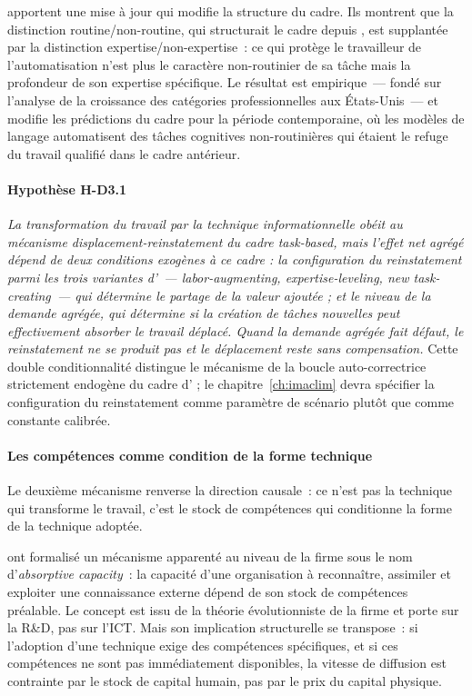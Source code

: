 \textcite{autor_expertise_2025} apportent une mise à jour qui modifie la structure du cadre. Ils montrent que la distinction routine/non-routine, qui structurait le cadre depuis \textcite{autor_skill_2003}, est supplantée par la distinction expertise/non-expertise~: ce qui protège le travailleur de l'automatisation n'est plus le caractère non-routinier de sa tâche mais la profondeur de son expertise spécifique. Le résultat est empirique~--- fondé sur l'analyse de la croissance des catégories professionnelles aux États-Unis~--- et modifie les prédictions du cadre pour la période contemporaine, où les modèles de langage automatisent des tâches cognitives non-routinières qui étaient le refuge du travail qualifié dans le cadre antérieur.


\paragraph{Hypothèse H-D3.1} \emph{La transformation du travail par la technique informationnelle obéit au mécanisme displacement-reinstatement du cadre \emph{task-based}, mais l'effet net agrégé dépend de deux conditions exogènes à ce cadre : la configuration du reinstatement parmi les trois variantes d'\textcite{acemoglu_building_2026}~--- \emph{labor-augmenting}, \emph{expertise-leveling}, \emph{new task-creating}~--- qui détermine le partage de la valeur ajoutée ; et le niveau de la demande agrégée, qui détermine si la création de tâches nouvelles peut effectivement absorber le travail déplacé. Quand la demande agrégée fait défaut, le reinstatement ne se produit pas et le déplacement reste sans compensation.} Cette double conditionnalité distingue le mécanisme de la boucle auto-correctrice strictement endogène du cadre d'\textcite{acemoglu_race_2018} ; le chapitre~\ref{ch:imaclim} devra spécifier la configuration du reinstatement comme paramètre de scénario plutôt que comme constante calibrée.

\paragraph{Les compétences comme condition de la forme technique}

Le deuxième mécanisme renverse la direction causale~: ce n'est pas la technique qui transforme le travail, c'est le stock de compétences qui conditionne la forme de la technique adoptée.

\textcite{cohen_absorptive_1990} ont formalisé un mécanisme apparenté au niveau de la firme sous le nom d'\emph{absorptive capacity}~: la capacité d'une organisation à reconnaître, assimiler et exploiter une connaissance externe dépend de son stock de compétences préalable. Le concept est issu de la théorie évolutionniste de la firme \parencite{nelson_winter_1982} et porte sur la R\&D, pas sur l'ICT. Mais son implication structurelle se transpose~: si l'adoption d'une technique exige des compétences spécifiques, et si ces compétences ne sont pas immédiatement disponibles, la vitesse de diffusion est contrainte par le stock de capital humain, pas par le prix du capital physique.

